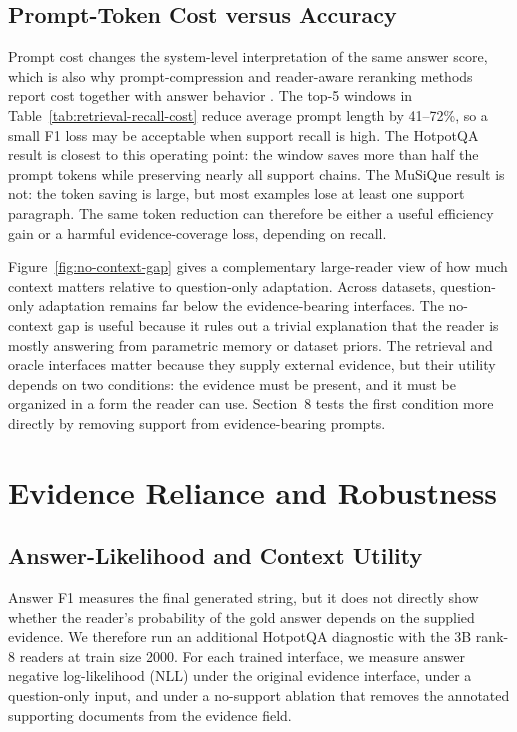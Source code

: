 \documentclass[a4paper,fleqn]{cas-sc}
\begin{document}
\subsection{Prompt-Token Cost versus Accuracy}

Prompt cost changes the system-level interpretation of the same answer score,
which is also why prompt-compression and reader-aware reranking methods report
cost together with answer behavior \citep{jiang2023longllmlingua,yu2024rankrag}.
The top-5 windows in Table~\ref{tab:retrieval-recall-cost} reduce average
prompt length by 41--72\%, so a small F1 loss may be acceptable when support
recall is high. The HotpotQA result is closest to this operating point: the
window saves more than half the prompt tokens while preserving nearly all
support chains. The MuSiQue result is not: the token saving is large, but most
examples lose at least one support paragraph. The same token reduction can
therefore be either a useful efficiency gain or a harmful evidence-coverage
loss, depending on recall.

Figure~\ref{fig:no-context-gap} gives a complementary large-reader view of how
much context matters relative to question-only adaptation. Across datasets,
question-only adaptation remains far below the evidence-bearing interfaces.
The no-context gap is useful because it rules out a trivial explanation that
the reader is mostly answering from parametric memory or dataset priors. The
retrieval and oracle interfaces matter because they supply external evidence,
but their utility depends on two conditions: the evidence must be present, and
it must be organized in a form the reader can use. Section~8 tests the first
condition more directly by removing support from evidence-bearing prompts.

\section{Evidence Reliance and Robustness}

\subsection{Answer-Likelihood and Context Utility}

Answer F1 measures the final generated string, but it does not directly show
whether the reader's probability of the gold answer depends on the supplied
evidence. We therefore run an additional HotpotQA diagnostic with the 3B
rank-8 readers at train size 2000. For each trained interface, we measure
answer negative log-likelihood (NLL) under the original evidence interface,
under a question-only input, and under a no-support ablation that removes the
annotated supporting documents from the evidence field.
\end{document}
